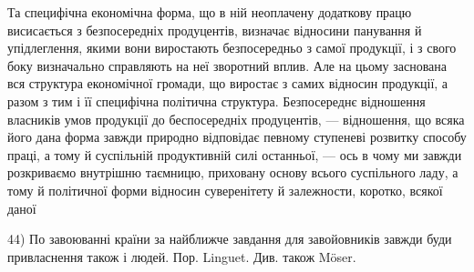 Та специфічна економічна форма, що в ній неоплачену додаткову працю висисається
з безпосередніх продуцентів, визначає відносини панування й упідлеглення,
якими вони виростають безпосередньо з самої продукції, і з свого боку визначально
справляють на неї зворотний вплив. Але на цьому заснована вся структура економічної
громади, що виростає з самих відносин продукції, а разом з тим і її специфічна
політична структура. Безпосереднє відношення власників умов продукції
до беспосередніх продуцентів, — відношення, що всяка його дана форма завжди
природно відповідає певному ступеневі розвитку способу праці, а тому й суспільній
продуктивній силі останньої, — ось в чому ми завжди розкриваємо
внутрішню таємницю, приховану основу всього суспільного ладу, а тому й політичної
форми відносин суверенітету й залежности, коротко, всякої даної

44) По завоюванні країни за найближче завдання для завойовників завжди буди привласнення також і
людей. Пор. Linguet. Див. також Möser.
